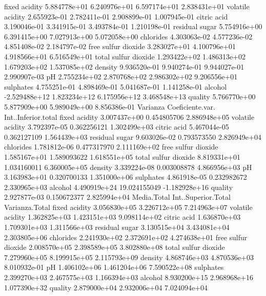 \documentclass[
]{article}
\begin{document}
fixed acidity 5.884778e+01 6.240976e+01 6.597174e+01 2.838431e+01
volatile acidity 2.655923e-01 2.782411e-01 2.908899e-01 1.007945e-01
citric acid 3.190046e-01 3.341915e-01 3.493784e-01 1.210198e-01 residual
sugar 5.754916e+00 6.391415e+00 7.027913e+00 5.072058e+00 chlorides
4.303063e-02 4.577236e-02 4.851408e-02 2.184797e-02 free sulfur dioxide
3.283027e+01 4.100796e+01 4.918566e+01 6.516549e+01 total sulfur dioxide
1.293422e+02 1.486313e+02 1.679203e+02 1.537085e+02 density 9.936520e-01
9.940274e-01 9.944027e-01 2.990907e-03 pH 2.755234e+02 2.870768e+02
2.986302e+02 9.206556e+01 sulphates 4.755251e-01 4.898469e-01
5.041687e-01 1.141258e-01 alcohol -2.529488e+12 1.823234e+12
6.175956e+12 3.468548e+13 quality 5.766770e+00 5.877909e+00 5.989049e+00
8.856386e-01 Varianza Coeficiente.var. Int..Inferior.total fixed acidity
3.007437e+00 0.454805706 2.886948e+05 volatile acidity 3.792397e-05
0.362256121 1.302499e+03 citric acid 5.467044e-05 0.362127109
1.564439e+03 residual sugar 9.603026e-02 0.793573550 2.826949e+04
chlorides 1.781812e-06 0.477317970 2.111169e+02 free sulfur dioxide
1.585167e+01 1.589093622 1.618551e+05 total sulfur dioxide 8.819331e+01
1.034160011 6.360005e+05 density 3.339224e-08 0.003008878 4.866956e+03
pH 3.163983e+01 0.320700133 1.351000e+06 sulphates 4.861918e-05
0.232982672 2.330965e+03 alcohol 4.490919e+24 19.024155049 -1.182928e+16
quality 2.927877e-03 0.150672377 2.825994e+04 Media.Total
Int..Superior.Total Varianza.Total fixed acidity 3.056830e+05
3.226712e+05 7.214963e+07 volatile acidity 1.362825e+03 1.423151e+03
9.098114e+02 citric acid 1.636870e+03 1.709301e+03 1.311566e+03 residual
sugar 3.130515e+04 3.434081e+04 2.303805e+06 chlorides 2.241930e+02
2.372691e+02 4.274638e+01 free sulfur dioxide 2.008570e+05 2.398589e+05
3.802880e+08 total sulfur dioxide 7.279960e+05 8.199915e+05 2.115793e+09
density 4.868746e+03 4.870536e+03 8.010932e-01 pH 1.406102e+06
1.461204e+06 7.590522e+08 sulphates 2.399270e+03 2.467575e+03
1.166394e+03 alcohol 8.930200e+15 2.968968e+16 1.077390e+32 quality
2.879000e+04 2.932006e+04 7.024094e+04
\end{document}
